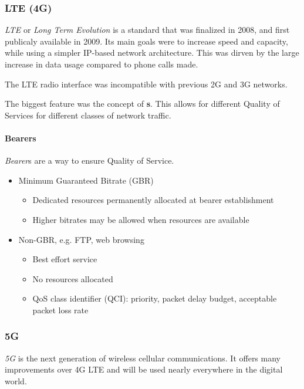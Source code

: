 \subsubsection{LTE (4G)}\label{subsubsec:4G}
\begin{definition}[LTE]\label{def:LTE}
  \emph{LTE} or \emph{Long Term Evolution} is a standard that was finalized in 2008, and first publicaly available in 2009.
  Its main goals were to increase speed and capacity, while using a simpler IP-based network architecture.
  This was dirven by the large increase in data usage compared to phone calls made.

  The LTE radio interface was incompatible with previous 2G and 3G networks.

  The biggest feature was the concept of \textbf{s}.
  This allows for different Quality of Services for different classes of network traffic.
\end{definition}

\paragraph{Bearers}\label{par:Bearers}
\begin{definition}[Bearer]\label{def:Bearer}
  \emph{Bearer}s are a way to ensure Quality of Service.

  \begin{itemize}[noitemsep]
  \item Minimum Guaranteed Bitrate (GBR)
    \begin{itemize}[noitemsep]
    \item Dedicated resources permanently allocated at bearer establishment
    \item Higher bitrates may be allowed when resources are available
    \end{itemize}

  \item Non-GBR, e.g. FTP, web browsing
    \begin{itemize}[noitemsep]
    \item Best effort service
    \item No resources allocated
    \item QoS class identifier (QCI): priority, packet delay budget, acceptable packet loss rate
    \end{itemize}
  \end{itemize}
\end{definition}

\subsubsection{5G}\label{subsubsec:5G}
\begin{definition}[5G]\label{def:5G}
  \emph{5G} is the next generation of wireless cellular communications.
  It offers many improvements over 4G LTE and will be used nearly everywhere in the digital world.
\end{definition}

